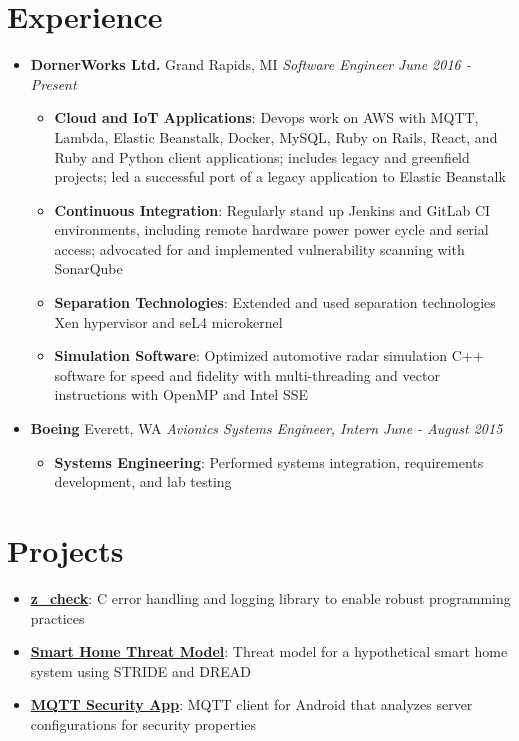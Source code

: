 \documentclass[letterpaper,11pt]{article}
\newcommand{\resumeItem}[2]{
  \item\small{
    \textbf{#1}{: #2 \vspace{-2pt}}
  }
}
\newcommand{\resumeSubheading}[4]{
  \vspace{-1pt}\item
    \textbf{#1} \dotfill #2 \newline
    \textit{\small#3} \hfill \textit{\small #4}
  \vspace{-5pt}
}
\newcommand{\resumeSubItem}[2]{\resumeItem{#1}{#2}\vspace{-4pt}}
\newcommand{\resumeSubHeadingListStart}{\begin{itemize}[leftmargin=*]}
\newcommand{\resumeSubHeadingListEnd}{\end{itemize}}
\newcommand{\resumeItemListStart}{\begin{itemize}}
\newcommand{\resumeItemListEnd}{\end{itemize}\vspace{-5pt}}
\begin{document}
\section{Experience}
  \resumeSubHeadingListStart

    \resumeSubheading
      {DornerWorks Ltd.}{Grand Rapids, MI}
      {Software Engineer}{June 2016 - Present}
      \resumeItemListStart
        \resumeItem{Cloud and IoT Applications}
          {Devops work on AWS with MQTT, Lambda, Elastic Beanstalk, Docker, MySQL, Ruby on Rails, React, and Ruby and Python client applications;
            includes legacy and greenfield projects; led a successful port of a legacy application to Elastic Beanstalk}
        \resumeItem{Continuous Integration}
          {Regularly stand up Jenkins and GitLab CI environments, including remote hardware power power cycle and serial access;
            advocated for and implemented vulnerability scanning with SonarQube}
        \resumeItem{Separation Technologies}
          {Extended and used separation technologies Xen hypervisor and seL4 microkernel}
        \resumeItem{Simulation Software}
          {Optimized automotive radar simulation C++ software for speed and fidelity with multi-threading and vector instructions with OpenMP and Intel SSE}
      \resumeItemListEnd

    \resumeSubheading
      {Boeing}{Everett, WA}
      {Avionics Systems Engineer, Intern}{June - August 2015}
      \resumeItemListStart
        \resumeItem{Systems Engineering}
          {Performed systems integration, requirements development, and lab testing}
      \resumeItemListEnd

  \resumeSubHeadingListEnd


\section{Projects}
  \resumeSubHeadingListStart
    \resumeSubItem{\href{https://github.com/kkredit/z_check}{z\_check}}
      {C error handling and logging library to enable robust programming practices}
    \resumeSubItem{\href{https://github.com/kkredit/smart-home-threat-model}{Smart Home Threat Model}}
      {Threat model for a hypothetical smart home system using STRIDE and DREAD}
    \resumeSubItem{\href{https://github.com/kkredit/MQTT-sweeper-android}{MQTT Security App}}
      {MQTT client for Android that analyzes server configurations for security properties}
  \resumeSubHeadingListEnd
\end{document}
